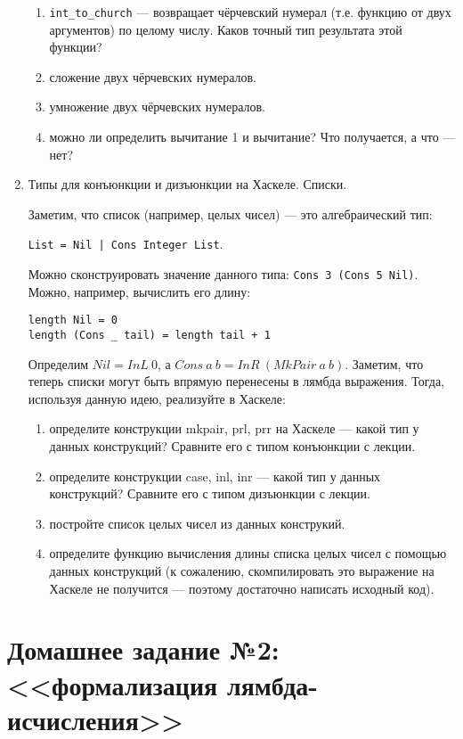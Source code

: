 \documentclass[10pt,a4paper,oneside]{article}
\begin{document}
\begin{enumerate}
\begin{enumerate}
\item \verb!int_to_church! --- возвращает чёрчевский нумерал (т.е. функцию от двух аргументов) по целому числу.
Каков точный тип результата этой функции?
\item сложение двух чёрчевских нумералов.
\item умножение двух чёрчевских нумералов.
\item можно ли определить вычитание 1 и вычитание? Что получается, а что --- нет?
\end{enumerate}

\item Типы для конъюнкции и дизъюнкции на Хаскеле. Списки.

Заметим, что список (например, целых чисел) — это алгебраический тип: 

\verb!List = Nil | Cons Integer List!.

Можно сконструировать значение данного типа: \verb!Cons 3 (Cons 5 Nil)!.
Можно, например, вычислить его длину:
\begin{verbatim}
length Nil = 0
length (Cons _ tail) = length tail + 1
\end{verbatim}

Определим $Nil = InL\ 0$, а $Cons\ a\ b = InR\ (MkPair\ a\ b)$. Заметим, что теперь списки могут быть впрямую
перенесены в лямбда выражения. Тогда, используя данную идею, реализуйте в Хаскеле:

\begin{enumerate}
\item определите конструкции mkpair, prl, prr на Хаскеле --- какой тип у данных конструкций? Сравните его с типом конъюнкции с лекции.
\item определите конструкции case, inl, inr --- какой тип у данных конструкций? Сравните его с типом дизъюнкции с лекции.
\item постройте список целых чисел из данных конструкий.
\item определите функцию вычисления длины списка целых чисел с помощью данных конструкций (к сожалению, скомпилировать это
выражение на Хаскеле не получится — поэтому достаточно написать исходный код).
\end{enumerate}

\end{enumerate}

\section*{Домашнее задание №2: <<формализация лямбда-исчисления>>}
\end{document}
